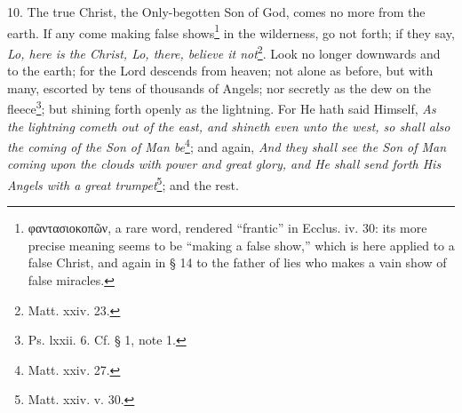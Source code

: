 10. The true Christ, the Only-begotten Son of God, comes no more from the earth. If any come making false shows\footnote{\textgreek{φαντασιοκοπῶν}, a rare word, rendered “frantic” in Ecclus. iv. 30: its more precise meaning seems to be “making a false show,” which is here applied to a false Christ, and again in § 14 to the father of lies who makes a vain show of false miracles.} in the wilderness, go not forth; if they say, \emph{Lo, here is the Christ, Lo, there, believe it not}\footnote{Matt. xxiv. 23.}. Look no longer downwards and to the earth; for the Lord descends from heaven; not alone as before, but with many, escorted by tens of thousands of Angels; nor secretly as the dew on the fleece\footnote{Ps. lxxii. 6. Cf. § 1, note 1.}; but shining forth openly as the lightning. For He hath said Himself, \emph{As the lightning cometh out of the east, and shineth even unto the west, so shall also the coming of the Son of Man be}\footnote{Matt. xxiv. 27.}; and again, \emph{And they shall see the Son of Man coming upon the clouds with power and great glory, and He shall send forth His Angels with a great trumpet}\footnote{Matt. xxiv. v. 30.}; and the rest.

